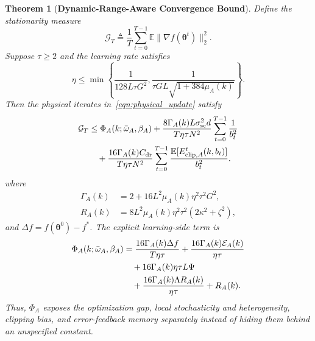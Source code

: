 \documentclass[journal]{IEEEtran}
\newenvironment{revisionblock}{\begingroup\color{revisionred}}{\endgroup}
\newtheorem{theorem}{Theorem}
\begin{document}
\begin{revisionblock}
\begin{theorem}[\bf Dynamic-Range-Aware Convergence Bound]
\label{thm:dr_convergence}
Define the stationarity measure
{
\begin{equation}
	\mathcal{G}_T
	\triangleq\frac1T\sum_{t=0}^{T-1}
	\mathbb{E}\|\nabla f(\boldsymbol{\theta}^t)\|_2^2.
\end{equation}
}
Suppose $\tau\ge2$ and the learning rate satisfies
{
\begin{equation}
	\eta\le\min\left\{
	\frac1{128L\tau G^2},
	\frac1{\tau GL\sqrt{1+384\mu_A(k)}}
	\right\}.
	\label{eqn:learning_rate_condition}
\end{equation}
}
Then the physical iterates in~\eqref{eqn:physical_update} satisfy
{
\begin{align}
	\mathcal{G}_T
	&\le\Phi_A(k;\bar{\omega}_A,\beta_A)
	+\frac{8\Gamma_A(k)L\sigma_{\mathrm{sc}}^2d}{T\eta\tau N^2}
	\sum_{t=0}^{T-1}\frac1{b_t^2}
	\notag\\
	&\quad+\frac{16\Gamma_A(k)C_{\mathrm{dr}}}{T\eta\tau N^2}
	\sum_{t=0}^{T-1}
	\frac{\mathbb{E}[E_{\mathrm{clip},A}^t(k,b_t)]}{b_t^2}.
	\label{eqn:dr_bound}
\end{align}
}
where
{
\begin{align}
	\Gamma_A(k)&=2+16L^2\mu_A(k)\eta^2\tau^2G^2,\\
	R_A(k)&=8L^2\mu_A(k)\eta^2\tau^2(2\kappa^2+\zeta^2),
	\label{eqn:gamma_RA}
\end{align}
}
and $\Delta f=f(\boldsymbol{\theta}^0)-f^\ast$. The explicit learning-side term is
{
\begin{align}
	\Phi_A(k;\bar{\omega}_A,\beta_A)
	&=\frac{16\Gamma_A(k)\Delta f}{T\eta\tau}
	+\frac{16\Gamma_A(k)\mathcal{E}_A(k)}{\eta\tau}
	\notag\\
		&\quad+16\Gamma_A(k)\eta\tau L\Psi
	\notag\\
		&\quad+\frac{16\Gamma_A(k)\Lambda R_A(k)}{\eta\tau}
	+R_A(k).
	\label{eqn:phiA}
\end{align}
}
Thus, $\Phi_A$ exposes the optimization gap, local stochasticity and heterogeneity, clipping bias, and error-feedback memory separately instead of hiding them behind an unspecified constant.
\end{theorem}


\end{revisionblock}
\end{document}
